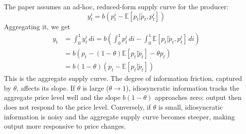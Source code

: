 \documentclass[12pt]{article}
\begin{document}
The paper assumes an ad-hoc, reduced-form supply curve for the producer:
\begin{equation}
	y_t^i = b (p_t^i - \mathbb{E}[p_t|\tilde{p}_t, p_t^i])
\end{equation}
Aggregating it, we get
\begin{align}
	y_t & = \int_0^1 y_t^i \, di = b \left(\int_0^1 p_t^i \, di - \int_0^1 \mathbb{E}[p_t|\tilde{p}_t, p_t^i] \,di\right) \nonumber \\
	& = b \left(p_t - (1-\theta) \mathbb{E}[p_t|\tilde{p}_t] - \theta p_t\right) \nonumber \\
	& = b(1-\theta) (p_t - \mathbb{E}[p_t|\tilde{p}_t])
\end{align}
This is the aggregate supply curve. The degree of information friction, captured by $\theta$, affects its slope. If $\theta$ is large ($\theta \to 1$), idiosyncratic information tracks the aggregate price level well and the slope $b(1-\theta)$ approaches zero; output then does not respond to the price level. Conversely, if $\theta$ is small, idiosyncratic information is noisy and the aggregate supply curve becomes steeper, making output more responsive to price changes.
\end{document}
